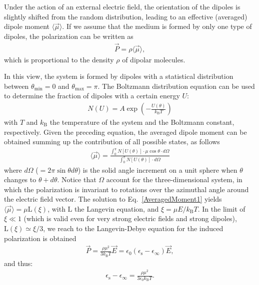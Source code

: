 Under the action of an external electric field, the orientation of the dipoles is slightly shifted from the random distribution, leading to an effective (averaged) dipole moment $\langle \vec{\mu} \rangle$. If we assume that the medium is formed by only one type of dipoles, the polarization can be written as
\begin{eqnarray}
\vec{P} = \rho \langle \vec{\mu} \rangle,
\label{GeneratlPolarization}
\end{eqnarray} 
which is proportional to the density $\rho$ of dipolar molecules.



In this view, the system is formed by dipoles with a statistical distribution between $\theta_\text{min} = 0 $ and $\theta_\text{max} = \pi$. The Boltzmann distribution equation can be used to determine the fraction of dipoles with a certain energy $U$:
\begin{eqnarray}
N (U) = A \exp \left( - \frac{U(\theta)} {k_\text{B} T} \right) 
\label{BoltzmannDistri}
\end{eqnarray} 
with $T$ and $k_\text{B}$ the temperature of the system and the Boltzmann constant, respectively. Given the preceding equation, the averaged dipole moment can be obtained summing up the contribution of all possible states, as follows
\begin{eqnarray}
\langle \vec{\mu} \rangle = \frac{ \int_0^\pi N[U(\theta)] \cdot \mu \cos \theta \cdot d\Omega     } {   \int_0^\pi N[U(\theta)] \cdot d\Omega   }
\label{AveragedMoment1}
\end{eqnarray} 
\noindent where $d\Omega$ ($= 2\pi \sin\theta d\theta$) is the solid angle increment on a unit sphere when $\theta$ changes to $\theta + d \theta$. Notice that $\Omega$ account for the three-dimensional system, in which the polarization is invariant to rotations over the azimuthal angle around the electric field vector. The solution to Eq.\ \ref{AveragedMoment1} yields $\langle \vec{\mu} \rangle = \mu \text{L}(\xi)$, with $\text{L}$ the Langevin equation, and $\xi = \mu E/ k_\text{B} T$. In the limit of $\xi \ll 1$ (which is valid even for very strong electric fields and strong dipoles), $\text{L} (\xi) \simeq \xi/3 $, we reach to the Langevin-Debye equation for the induced polarization is obtained\!\cite{DebyeBook1929,Evans1982}
\begin{eqnarray}
\vec{P} = \frac{\rho \mu^2}{3 k_\text{B} T} \vec{E} = \epsilon_0 (\epsilon_\text{s} - \epsilon_\infty) \vec{E},
\label{LangeDebyePolarization}
\end{eqnarray} 
and thus:
\begin{eqnarray}
\epsilon_\text{s} - \epsilon_\infty = \frac{\rho \mu^2}{3 \epsilon_0 k_\text{B} T}.
\label{FirstDielectricConstant}
\end{eqnarray} 




